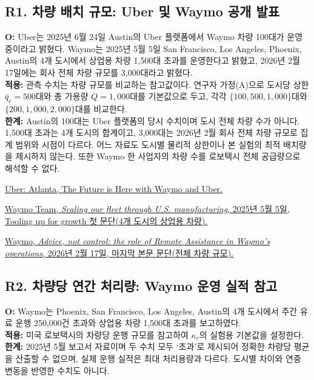 \documentclass[10pt,a4paper]{article}
\begin{document}
\subsection*{\hypertarget{rationale-R1}{R1. 차량 배치 규모: Uber 및 Waymo 공개 발표}}
\textbf{O:} Uber는 2025년 6월 24일 Austin의 Uber 플랫폼에서 Waymo 차량 100대가 운영 중이라고 밝혔다. Waymo는 2025년 5월 5일 San Francisco, Los Angeles, Phoenix, Austin의 4개 도시에서 상업용 차량 1,500대 초과를 운영한다고 밝혔고, 2026년 2월 17일에는 회사 전체 차량 규모를 3,000대라고 밝혔다. 
\\ \textbf{적용:} 관측 수치는 차량 규모를 비교하는 참고값이다. 연구자 가정(A)으로 도시당 상한 $\bar q_c=500$대와 총 가용량 $Q=1{,}000$대를 기본값으로 두고, 각각 $\{100,500,1{,}000\}$대와 $\{200,1{,}000,2{,}000\}$대를 비교한다.
\\ \textbf{한계:} Austin의 100대는 Uber 플랫폼의 당시 수치이며 도시 전체 차량 수가 아니다. 1,500대 초과는 4개 도시의 합계이고, 3,000대는 2026년 2월 회사 전체 차량 규모로 집계 범위와 시점이 다르다. 어느 자료도 도시별 물리적 상한이나 본 실험의 최적 배치량을 제시하지 않는다. 또한 Waymo 한 사업자의 차량 수를 로보택시 전체 공급량으로 해석할 수 없다.
\par\href{https://investor.uber.com/news-events/news/press-release-details/2025/Atlanta-The-Future-is-Here-with-Waymo-and-Uber-2025-y1tuDCCSgu/default.aspx}{Uber: Atlanta, The Future is Here with Waymo and Uber.} \par\href{https://waymo.com/blog/2025/05/scaling-our-fleet-through-us-manufacturing/#:~:text=over\%201\%2C500\%20vehicles}{Waymo Team, \textit{Scaling our fleet through U.S. manufacturing}, 2025년 5월 5일, Tooling up for growth 첫 문단(4개 도시의 상업용 차량).} \par\href{https://waymo.com/blog/shorts/advice-not-control-the-role-of-remote-assistance/#:~:text=fleet\%20of\%203\%2C000\%20vehicles}{Waymo, \textit{Advice, not control: the role of Remote Assistance in Waymo's operations}, 2026년 2월 17일, 마지막 본문 문단(전체 차량 규모).}

\subsection*{\hypertarget{rationale-R2}{R2. 차량당 연간 처리량: Waymo 운영 실적 참고}}

\noindent
\textbf{O:}
Waymo는 Phoenix, San Francisco, Los Angeles, Austin의
4개 도시에서 주간 유료 운행 250,000건 초과와
상업용 차량 1,500대 초과를 보고하였다. \\
\textbf{적용:}
미국 로보택시의 차량당 운행 규모를 참고하여
$\kappa_c$의 실험용 기본값을 설정한다. \\
\textbf{한계:}
2025년 5월 보고서 자료이며 두 수치 모두 `초과'로 제시되어 정확한 차량당 평균을 산출할 수 없으며, 실제 운행 실적은 최대 처리용량과 다르다. 도시별 차이와 연중 변동을 반영한 수치도 아니다.
\end{document}
